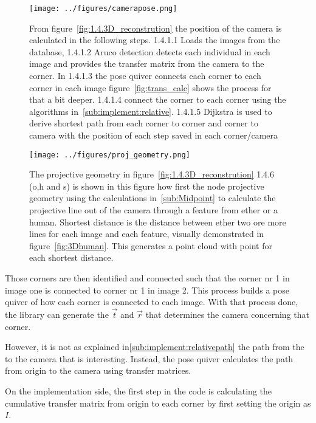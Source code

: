 \begin{figure}[ht]
\begin{center}
    \texttt{[image: ../figures/camerapose.png]}
\end{center}
\caption[1.4.1 Camera pose]{From figure~\ref{fig:1.4.3D_reconstrution} the position of the camera is calculated in the following steps. 1.4.1.1 Loads the images from the database, 1.4.1.2 Aruco detection detects each individual \aruco in each image and provides the transfer matrix from the camera to the \aruco corner. In 1.4.1.3 the pose quiver connects each corner to each corner in each image figure~\ref{fig:trans_calc} shows the process for that a bit deeper. 1.4.1.4 connect the corner to each corner using the algorithms in~\ref{sub:implement:relative}. 1.4.1.5 Dijkstra is used to derive shortest path from each corner to corner and corner to camera with the position of each step saved in each corner/camera}
\label{fig:1.4.1_camerapose}
\end{figure}


\begin{figure}[ht]
\begin{center}
    \texttt{[image: ../figures/proj\_geometry.png]}
\end{center}
\caption[1.4.6 Projection geometry]{The projective geometry in figure~\ref{fig:1.4.3D_reconstrution} 1.4.6 (o,h and s) is shown in this figure how first the node projective geometry using the calculations in~\ref{sub:Midpoint} to calculate the projective line out of the camera through a feature from ether \openpose or a human. Shortest distance is the distance between ether two ore more lines for each image and each feature, visually demonstrated in figure~\ref{fig:3Dhuman}. This generates a point cloud with point for each shortest distance.}
\label{fig:1.4.6.proj_geometry}
\end{figure}




Those corners are then identified and connected such that the corner nr 1 in image one is connected to corner nr 1 in image 2.
This process builds a pose quiver of how each corner is connected to each image.
With that process done, the \aruco{ } library can generate the $\vec{t}$ and $\vec{r}$ that determines the camera concerning that corner.

However, it is not as explained in\ref{sub:implement:relativepath} the path from the \aruco to the camera that is interesting.
Instead, the pose quiver calculates the path from origin to the camera using transfer matrices.

On the implementation side, the first step in the code is calculating the cumulative transfer matrix from origin to each corner by first setting the origin as $I$.




